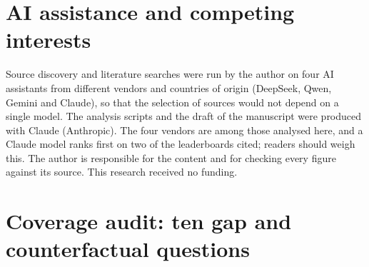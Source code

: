 \documentclass[11pt]{article}
\begin{document}
\section*{AI assistance and competing interests}
Source discovery and literature searches were run by the author on four AI assistants from different vendors and countries of origin (DeepSeek, Qwen, Gemini and Claude), so that the selection of sources would not depend on a single model. The analysis scripts and the draft of the manuscript were produced with Claude (Anthropic). The four vendors are among those analysed here, and a Claude model ranks first on two of the leaderboards cited; readers should weigh this. The author is responsible for the content and for checking every figure against its source. This research received no funding.

\clearpage
\appendix
\section{Coverage audit: ten gap and counterfactual questions}
\label{app:audit}
\end{document}
